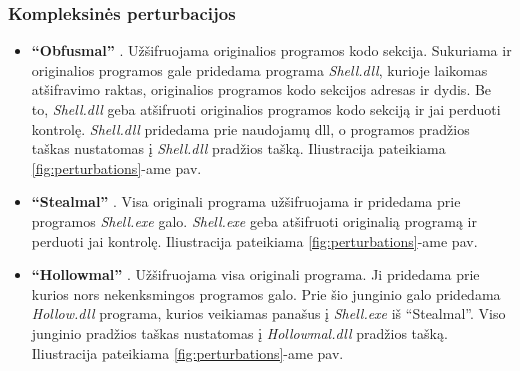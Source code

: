 \subsubsection{Kompleksinės perturbacijos}
\begin{itemize}
    \item \textbf{\enquote{Obfusmal}} \cite{zhongMalFoxCamouflagedAdversarial2024}. Užšifruojama originalios programos kodo sekcija. Sukuriama ir originalios programos gale pridedama programa \textit{Shell.dll}, kurioje laikomas atšifravimo raktas, originalios programos kodo sekcijos adresas ir dydis. Be to, \textit{Shell.dll} geba atšifruoti originalios programos kodo sekciją ir jai perduoti kontrolę. \textit{Shell.dll} pridedama prie naudojamų \acs{dll}, o programos pradžios taškas nustatomas į \textit{Shell.dll} pradžios tašką. Iliustracija pateikiama \ref{fig:perturbations}-ame pav.
    \item \textbf{\enquote{Stealmal}} \cite{zhongMalFoxCamouflagedAdversarial2024}. Visa originali programa užšifruojama ir pridedama prie programos \textit{Shell.exe} galo. \textit{Shell.exe} geba atšifruoti originalią programą ir perduoti jai kontrolę. Iliustracija pateikiama \ref{fig:perturbations}-ame pav.
    \item \textbf{\enquote{Hollowmal}} \cite{zhongMalFoxCamouflagedAdversarial2024}. Užšifruojama visa originali programa. Ji pridedama prie kurios nors nekenksmingos programos galo. Prie šio junginio galo pridedama \textit{Hollow.dll} programa, kurios veikiamas panašus į \textit{Shell.exe} iš \enquote{Stealmal}. Viso junginio pradžios taškas nustatomas į \textit{Hollowmal.dll} pradžios tašką. Iliustracija pateikiama \ref{fig:perturbations}-ame pav.
\end{itemize}
